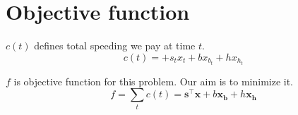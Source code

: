 \section{Objective function}

\begin{definition}{$c(t)$}
defines total speeding we pay at time $t$.
    \begin{equation}
        \label{eq:cost-t}
        c(t) = + s_t x_t + b x_{b_t} + h x_{h_t}
    \end{equation}
\end{definition}

\begin{definition}{$f$}
    is objective function for this problem. Our aim is to minimize it.
    \begin{equation}
        f =  \sum_t{c(t)} = \mathbf{s}^\intercal \mathbf{x} + b \mathbf{x_b} + h \mathbf{x_h}
        \label{eq:cost-f}
    \end{equation}
\end{definition}
